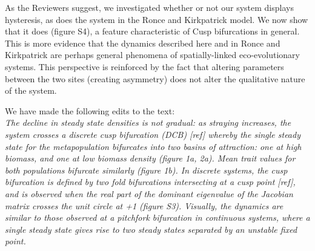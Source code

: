 \documentclass[ucm,12pt]{ucletter}
\newcounter{section}
\begin{document}
\begin{letter}

As the Reviewers suggest, we investigated whether or not our system displays hysteresis, as does the system in the Ronce and Kirkpatrick model.
We now show that it does (figure S4), a feature characteristic of Cusp bifurcations in general.
This is more evidence that the dynamics described here and in Ronce and Kirkpatrick are perhaps general phenomena of spatially-linked eco-evolutionary systems.
This perspective is reinforced by the fact that altering parameters between the two sites (creating asymmetry) does not alter the qualitative nature of the system.


\noindent We have made the following edits to the text:\\
 \emph{The decline in steady state densities is not gradual: as straying increases, the system crosses a discrete cusp bifurcation (DCB) [ref] whereby the single steady state for the metapopulation bifurcates into two basins of attraction: one at high biomass, and one at low biomass density (figure 1a, 2a).
Mean trait values for both populations bifurcate similarly (figure 1b). 
In discrete systems, the cusp bifurcation is defined by two fold bifurcations intersecting at a cusp point [ref], and is observed when the real part of the dominant eigenvalue of the Jacobian matrix crosses the unit circle at +1 (figure S3).
Visually, the dynamics are similar to those observed at a pitchfork bifurcation in continuous systems, where a single steady state gives rise to two steady states separated by an unstable fixed point.
}



\end{letter}
\end{document}
